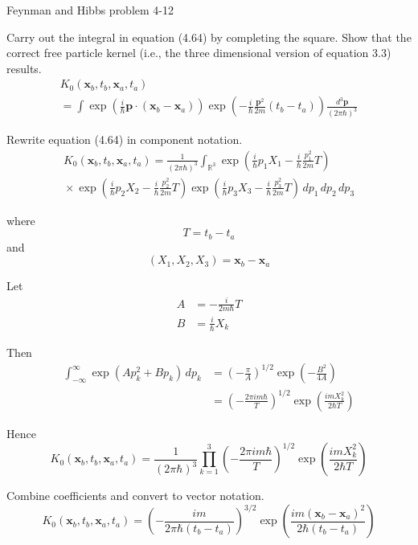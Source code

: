 \documentclass[12pt]{article}
\newcommand\INT{\int_{\mathbb R^3}}
\begin{document}
\begin{center}
Feynman and Hibbs problem 4-12
\end{center}

Carry out the integral in equation (4.64) by completing the square.
Show that the correct free particle kernel
(i.e., the three dimensional version of equation 3.3) results.
\begin{multline*}
K_0(\mathbf x_b,t_b,\mathbf x_a,t_a)
\\
=\int
\exp\left(\frac{i}{\hbar}\mathbf p\cdot(\mathbf x_b-\mathbf x_a)\right)
\exp\left(-\frac{i}{\hbar}\frac{\mathbf p^2}{2m}(t_b-t_a)\right)
\frac{d^3\mathbf p}{(2\pi\hbar)^3}
\tag{4.64}
\end{multline*}

Rewrite equation (4.64) in component notation.
\begin{multline*}
K_0(\mathbf x_b,t_b,\mathbf x_a,t_a)=\frac{1}{(2\pi\hbar)^3}\INT
\exp\left(\frac{i}{\hbar}p_1X_1-\frac{i}{\hbar}\frac{p_1^2}{2m}T\right)
\\
{}\times
\exp\left(\frac{i}{\hbar}p_2X_2-\frac{i}{\hbar}\frac{p_2^2}{2m}T\right)
\exp\left(\frac{i}{\hbar}p_3X_3-\frac{i}{\hbar}\frac{p_3^2}{2m}T\right)
\,dp_1\,dp_2\,dp_3
\end{multline*}

where
\begin{equation*}
T=t_b-t_a
\end{equation*}
and
\begin{equation*}
(X_1,X_2,X_3)=\mathbf x_b-\mathbf x_a
\end{equation*}

Let
\begin{align*}
A&=-\frac{i}{2m\hbar}T
\\
B&=\frac{i}{\hbar}X_k
\end{align*}

Then
\begin{align*}
\int_{-\infty}^\infty\exp(Ap_k^2+Bp_k)\,dp_k
&=\left(-\frac{\pi}{A}\right)^{1/2}\exp\left(-\frac{B^2}{4A}\right)
\\
&=\left(-\frac{2\pi im\hbar}{T}\right)^{1/2}
\exp\left(\frac{imX_k^2}{2\hbar T}\right)
\tag{1}
\end{align*}

Hence
\begin{equation*}
K_0(\mathbf x_b,t_b,\mathbf x_a,t_a)=
\frac{1}{(2\pi\hbar)^3}
\prod_{k=1}^3
\left(-\frac{2\pi im\hbar}{T}\right)^{1/2}
\exp\left(\frac{imX_k^2}{2\hbar T}\right)
\end{equation*}

Combine coefficients and convert to vector notation.
\begin{equation*}
K_0(\mathbf x_b,t_b,\mathbf x_a,t_a)=
\left(-\frac{im}{2\pi\hbar(t_b-t_a)}\right)^{3/2}
\exp\left(\frac{im(\mathbf x_b-\mathbf x_a)^2}{2\hbar(t_b-t_a)}\right)
\tag{2}
\end{equation*}
\end{document}
